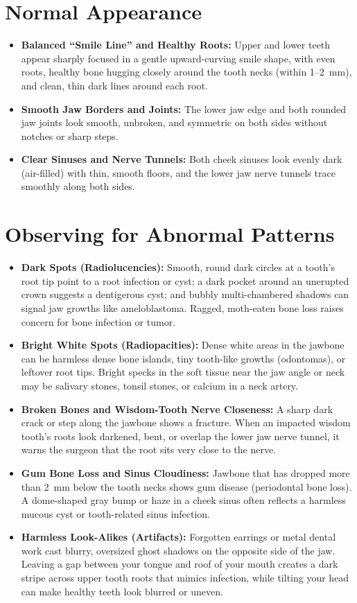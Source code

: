 \section{Normal Appearance}
\begin{itemize}
\item \textbf{Balanced ``Smile Line'' and Healthy Roots:} Upper and lower teeth appear sharply focused in a gentle upward-curving smile shape, with even roots, healthy bone hugging closely around the tooth necks (within 1--2~mm), and clean, thin dark lines around each root.
\item \textbf{Smooth Jaw Borders and Joints:} The lower jaw edge and both rounded jaw joints look smooth, unbroken, and symmetric on both sides without notches or sharp steps.
\item \textbf{Clear Sinuses and Nerve Tunnels:} Both cheek sinuses look evenly dark (air-filled) with thin, smooth floors, and the lower jaw nerve tunnels trace smoothly along both sides.
\end{itemize}

\section{Observing for Abnormal Patterns}
\begin{itemize}
\item \textbf{Dark Spots (Radiolucencies):} Smooth, round dark circles at a tooth's root tip point to a root infection or cyst; a dark pocket around an unerupted crown suggests a dentigerous cyst; and bubbly multi-chambered shadows can signal jaw growths like ameloblastoma. Ragged, moth-eaten bone loss raises concern for bone infection or tumor.
\item \textbf{Bright White Spots (Radiopacities):} Dense white areas in the jawbone can be harmless dense bone islands, tiny tooth-like growths (odontomas), or leftover root tips. Bright specks in the soft tissue near the jaw angle or neck may be salivary stones, tonsil stones, or calcium in a neck artery.
\item \textbf{Broken Bones and Wisdom-Tooth Nerve Closeness:} A sharp dark crack or step along the jawbone shows a fracture. When an impacted wisdom tooth's roots look darkened, bent, or overlap the lower jaw nerve tunnel, it warns the surgeon that the root sits very close to the nerve.
\item \textbf{Gum Bone Loss and Sinus Cloudiness:} Jawbone that has dropped more than 2~mm below the tooth necks shows gum disease (periodontal bone loss). A dome-shaped gray bump or haze in a cheek sinus often reflects a harmless mucous cyst or tooth-related sinus infection.
\item \textbf{Harmless Look-Alikes (Artifacts):} Forgotten earrings or metal dental work cast blurry, oversized ghost shadows on the opposite side of the jaw. Leaving a gap between your tongue and roof of your mouth creates a dark stripe across upper tooth roots that mimics infection, while tilting your head can make healthy teeth look blurred or uneven.
\end{itemize}

